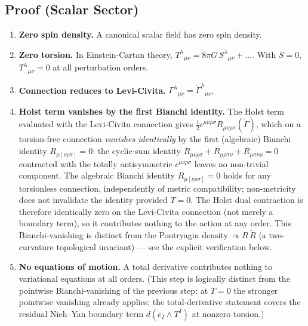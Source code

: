 \documentclass[aps,prd,twocolumn,superscriptaddress,showpacs,preprintnumbers,nofootinbib,longbibliography,floatfix]{revtex4-2}
\begin{document}
\subsection{Proof (Scalar Sector)}\label{sec:transp_proof}

\begin{enumerate}
\item \textbf{Zero spin density.} A canonical scalar field has zero spin density.

\item \textbf{Zero torsion.} In Einstein-Cartan theory, $T^\lambda{}_{\mu\nu}
= 8\pi G\,S^\lambda{}_{\mu\nu} + \ldots$. With $S=0$, $T^\lambda{}_{\mu\nu}=0$
at all perturbation orders.

\item \textbf{Connection reduces to Levi-Civita.} $\Gamma^\lambda{}_{\mu\nu}
= \mathring{\Gamma}^\lambda{}_{\mu\nu}$.

\item \textbf{Holst term vanishes by the first Bianchi identity.}
The Holst term evaluated with
the Levi-Civita connection gives $\frac{1}{2}\epsilon^{\mu\nu\rho\sigma}
R_{\mu\nu\rho\sigma}(\mathring{\Gamma})$, which on a torsion-free
connection \emph{vanishes identically} by the first (algebraic) Bianchi identity
$R_{\mu[\nu\rho\sigma]} = 0$: the cyclic-sum identity $R_{\mu\nu\rho\sigma} +
R_{\mu\rho\sigma\nu} + R_{\mu\sigma\nu\rho} = 0$ contracted with the totally
antisymmetric $\epsilon^{\mu\nu\rho\sigma}$ leaves no non-trivial component.
The algebraic Bianchi identity $R_{\mu[\nu\rho\sigma]}=0$ holds for any
torsionless connection, independently of metric compatibility; non-metricity
does not invalidate the identity provided $T=0$.
The Holst dual contraction is therefore identically zero on the Levi-Civita
connection (not merely a boundary term), so it contributes nothing to the
action at any order. This Bianchi-vanishing is distinct from the Pontryagin
density $\propto R\,\widetilde R$ (a two-curvature topological invariant) ---
see the explicit verification below.

\item \textbf{No equations of motion.} A total derivative contributes nothing
to variational equations at all orders. (This step is logically distinct
from the pointwise Bianchi-vanishing of the previous step: at $T=0$ the
stronger pointwise vanishing already applies; the total-derivative
statement covers the residual Nieh--Yan boundary term
$d(e_I\wedge T^I)$ at nonzero torsion.)
\end{enumerate}
\end{document}
